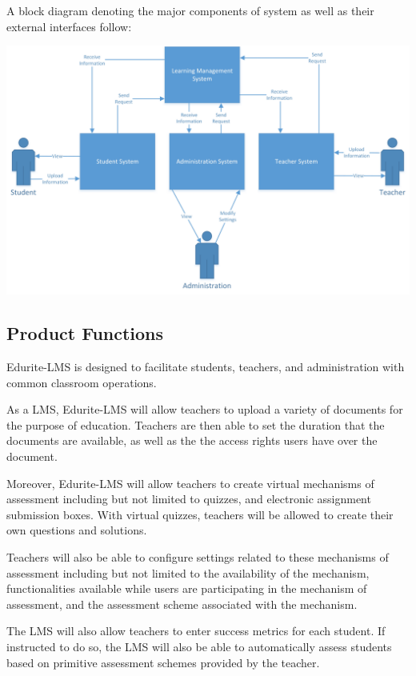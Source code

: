 \documentclass[]{article}
\begin{document}
A block diagram denoting the major components of system as well as their 
external interfaces follow:

\begin{center}
\includegraphics[scale=0.7]{A1_Assets/2-1_Product_Perspective_Diagram.jpg}
\end{center}


\subsection{Product Functions}
\label{sub:product_functions}
Edurite-LMS is designed to facilitate students, teachers, and administration 
with common classroom operations. 

As a LMS, Edurite-LMS will allow teachers to upload a variety of documents for 
the purpose of education. Teachers are then able to set the duration that the 
documents are available, as well as the the access rights users have over the 
document.

Moreover, Edurite-LMS will allow teachers to create virtual mechanisms of 
assessment including but not limited to quizzes, and electronic assignment 
submission boxes. With virtual quizzes, teachers will be allowed to create their 
own questions and solutions.

Teachers will also be able to configure settings related to these mechanisms of 
assessment including but not limited to the availability of the mechanism, 
functionalities available while users are participating in the mechanism of 
assessment, and the assessment scheme associated with the mechanism. 

The LMS will also allow teachers to enter success metrics for each student. If 
instructed to do so, the LMS will also be able to automatically assess students 
based on primitive assessment schemes provided by the teacher.
\end{document}
